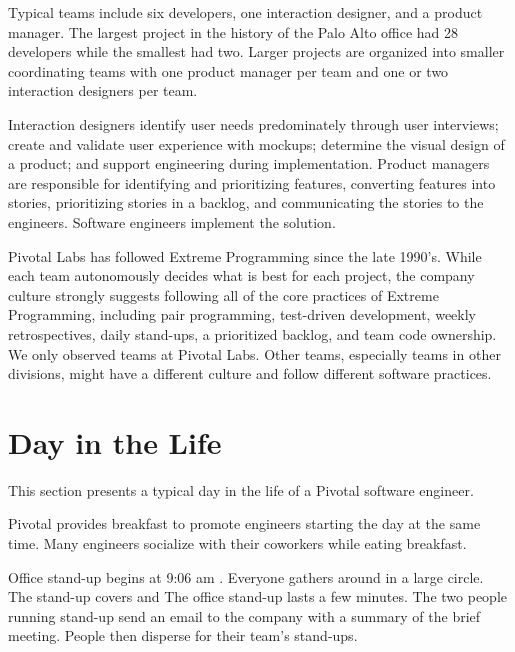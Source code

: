 Typical teams include six developers, one interaction designer, and a product manager. The largest project in the history of the Palo Alto office had 28 developers while the smallest had two. Larger projects are organized into smaller coordinating teams with one product manager per team and one or two interaction designers per team.

Interaction designers identify user needs predominately through user interviews; create and validate user experience with mockups; determine the visual design of a product; and support engineering during implementation. Product managers are responsible for identifying and prioritizing features, converting features into stories, prioritizing stories in a backlog, and communicating the stories to the engineers. Software engineers implement the solution. 

Pivotal Labs has followed Extreme Programming \cite{BeckExtremeProgramming2004} since the late 1990's. While each team autonomously decides what is best for each project, the company culture strongly suggests following all of the core practices of Extreme Programming, including pair programming, test-driven development, weekly retrospectives, daily stand-ups, a prioritized backlog, and team code ownership. We only observed teams at Pivotal Labs. Other teams, especially teams in other divisions, might have a different culture and follow different software practices.

\section{Day in the Life}
This section presents a typical day in the life of a Pivotal software engineer.

Pivotal provides breakfast to promote engineers starting the day at the same time. Many engineers socialize with their coworkers while eating breakfast. 

Office stand-up begins at 9:06 am \cite{BBCPivotal9am}. Everyone gathers around in a large circle. The stand-up covers    and  The office stand-up lasts a few minutes. The two people running stand-up send an email to the company with a summary of the brief meeting. People then disperse for their team's stand-ups.

